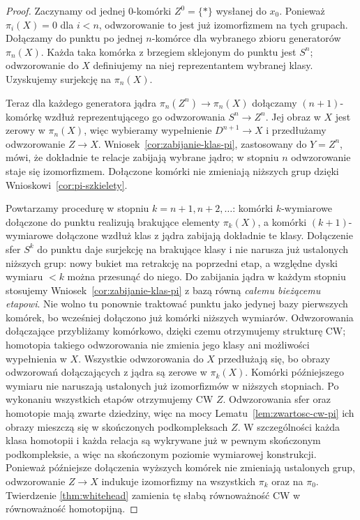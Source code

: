 \begin{proof}
Zaczynamy od jednej
$0$-komórki $Z^0=\{*\}$
wysłanej do $x_0$.
Ponieważ $\pi_i(X)=0$
dla $i<n$, odwzorowanie to
jest już izomorfizmem
na tych grupach.
Dołączamy do punktu
po jednej $n$-komórce
dla wybranego zbioru
generatorów $\pi_n(X)$.
Każda taka komórka
z brzegiem sklejonym
do punktu jest $S^n$;
odwzorowanie do $X$ definiujemy
na niej reprezentantem
wybranej klasy.
Uzyskujemy surjekcję
na $\pi_n(X)$.

Teraz dla każdego
generatora jądra
$\pi_n(Z^n)\to\pi_n(X)$
dołączamy $(n+1)$-komórkę
wzdłuż reprezentującego
go odwzorowania $S^n\to Z^n$.
Jej obraz w $X$
jest zerowy w $\pi_n(X)$,
więc wybieramy
wypełnienie $D^{n+1}\to X$
i przedłużamy odwzorowanie
$Z\to X$.
Wniosek~\ref{cor:zabijanie-klas-pi}, zastosowany do $Y=Z^n$,
mówi, że dokładnie te relacje zabijają wybrane jądro; w
stopniu $n$ odwzorowanie
staje się izomorfizmem.
Dołączone komórki
nie zmieniają niższych
grup dzięki
Wnioskowi~\ref{cor:pi-szkielety}.

Powtarzamy procedurę
w stopniu $k=n+1,n+2,\ldots$:
komórki $k$-wymiarowe
dołączone do punktu
realizują brakujące
elementy $\pi_k(X)$,
a komórki $(k+1)$-wymiarowe
dołączone wzdłuż klas
z jądra zabijają
dokładnie te klasy.
Dołączenie sfer $S^k$ do punktu daje surjekcję na brakujące klasy
i nie narusza już ustalonych niższych grup: nowy bukiet ma retrakcję
na poprzedni etap, a względne dyski wymiaru $<k$ można przesunąć do niego.
Do zabijania jądra w każdym stopniu stosujemy
Wniosek~\ref{cor:zabijanie-klas-pi} z bazą równą \emph{całemu bieżącemu etapowi}.
Nie wolno tu ponownie traktować punktu jako jedynej bazy pierwszych komórek,
bo wcześniej dołączono już komórki niższych wymiarów.
Odwzorowania dołączające przybliżamy komórkowo, dzięki czemu otrzymujemy strukturę CW;
homotopia takiego odwzorowania nie zmienia jego klasy ani możliwości wypełnienia w $X$.
Wszystkie odwzorowania do $X$ przedłużają się,
bo obrazy odwzorowań
dołączających z jądra
są zerowe w $\pi_k(X)$.
Komórki późniejszego
wymiaru nie naruszają
ustalonych już
izomorfizmów w
niższych stopniach.
Po wykonaniu
wszystkich etapów otrzymujemy CW $Z$.
Odwzorowania sfer oraz homotopie mają zwarte dziedziny,
więc na mocy Lematu~\ref{lem:zwartosc-cw-pi} ich obrazy mieszczą się
w skończonych podkompleksach $Z$. W szczególności każda klasa
homotopii i każda relacja są wykrywane już w pewnym skończonym
podkompleksie, a więc na skończonym poziomie wymiarowej konstrukcji.
Ponieważ późniejsze dołączenia wyższych komórek nie zmieniają
ustalonych grup, odwzorowanie $Z\to X$
indukuje izomorfizmy
na wszystkich
$\pi_k$ oraz na
$\pi_0$. Twierdzenie
\ref{thm:whitehead}
zamienia tę słabą
równoważność CW
w równoważność
homotopijną.
\end{proof}

